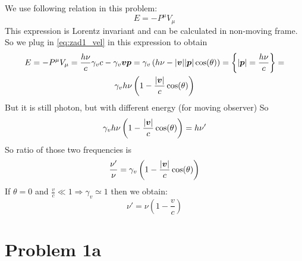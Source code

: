 We use following relation in this problem:
%
\begin{equation}
    E = -P^\mu V_\mu
\end{equation}
%
This expression is Lorentz invariant and can be calculated in non-moving frame.
So we plug in \autoref{eq:zad1_vel} in this expression to obtain
%
\begin{multline}
    E = -P^\mu V_\mu = \frac{h\nu}{c}\gamma_v c - \gamma_v \boldsymbol{v}\boldsymbol{p} = 
    \gamma_v\left(h\nu - |\boldsymbol{v}||\boldsymbol{p}|\cos(\theta)\right) = 
    \left\{|\boldsymbol{p}| = \frac{h\nu}{c}\right\} =\\
    \gamma_vh\nu\left(1-\frac{|\boldsymbol{v}|}{c}\cos(\theta)\right)
\end{multline}
%
But it is still photon, but with different energy (for moving observer) So
%
\begin{equation}
    \gamma_vh\nu\left(1-\frac{|\boldsymbol{v}|}{c}\cos(\theta)\right) = h\nu'
\end{equation}
%
So ratio of those two frequencies is
%
\begin{equation}
    \frac{\nu'}{\nu} = \gamma_v\left(1-\frac{|\boldsymbol{v}|}{c}\cos(\theta)\right)
\end{equation}
%
If $\theta = 0$ and $\frac{v}{c} \ll 1 \Rightarrow \gamma_v \simeq 1$ then we
obtain:
%
\begin{equation}
    \nu' = \nu \left(1-\frac{v}{c}\right)
\end{equation}

\newpage


\section*{Problem 1a}

